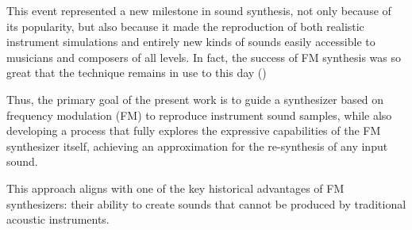 \documentclass[sigconf,natbib=false]{acmart}
\begin{document}
This event represented a new milestone in sound synthesis, not only because of its popularity, but also because it made the reproduction of both realistic instrument simulations and entirely new kinds of sounds easily accessible to musicians and composers of all levels. In fact, the success of FM synthesis was so great that the technique remains in use to this day (\textcite{holmes2016electronic})

Thus, the primary goal of the present work is to guide a synthesizer based on frequency modulation (FM) to reproduce instrument sound samples, while also developing a process that fully explores the expressive capabilities of the FM synthesizer itself, achieving an approximation for the re-synthesis of any input sound.

This approach aligns with one of the key historical advantages of FM synthesizers: their ability to create sounds that cannot be produced by traditional acoustic instruments.





\end{document}
